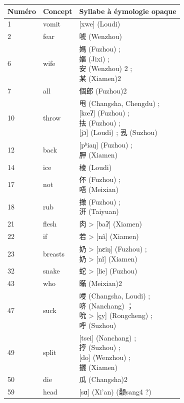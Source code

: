 \documentclass{scrbook}
\newcounter{c}[subsubsection]
\begin{document}
\begin{sloppypar}
\begin{appendices}
\begin{longtable}[htbp]{lll}
    \toprule
    Numéro & Concept & Syllabe à éymologie opaque \\
    \midrule
    1     & vomit & [xwe] (Loudi) \\
    2     & fear  & 唬 (Wenzhou) \\
    6     & wife  & \makecell[l]{媽 (Fuzhou) ; \\嫗 (Jixi) ; \\安 (Wenzhou) 2 ; \\某 (Xiamen)2}  \\
    7     & all   & 個郎 (Fuzhou)2 \\
    10    & throw & \makecell[l]{甩 (Changsha, Chengdu) ; \\{[kœʔ]} (Fuzhou) ; \\抾 (Fuzhou) ; \\{[jɔ]} (Loudi) ; 厾 (Suzhou)} \\
    12    & back  & \makecell[l]{{[pʰiaŋ]} (Fuzhou) ; \\胛 (Xiamen)} \\
    14    & ice  & 棱 (Loudi) \\
    17    & not   & \makecell[l]{伓 (Fuzhou) ; \\唔 (Meixian)} \\
    18    & rub   & \makecell[l]{撖 (Fuzhou) ; \\汧 (Taiyuan)} \\
    21    & flesh & 肉 > [baʔ] (Xiamen) \\
    22    & if    & 若 > [nã] (Xiamen) \\
    23    & breasts & \makecell[l]{奶 > [nɛiŋ] (Fuzhou) ; \\奶 > [nĩ] (Xiamen)} \\
    32    & snake & 蛇 > [lie] (Fuzhou) \\
    43    & who   & 瞞 (Meixian)2 \\
    47    & suck  & \makecell[l]{唚 (Changsha, Loudi) ; \\哜 (Nanchang) ； \\吮 > [çy] (Rongcheng) ; \\呼 (Suzhou)} \\
    49    & split & \makecell[l]{[tsei] (Nanchang) ; \\㧸 (Suzhou) ; \\{[do] (Wenzhou)} ; \\攦 (Xiamen)} \\
    50    & die   & 瓜 (Changsha)2 \\
    59    & head  & [sɑ] (Xi'an) (颡sang4 ?) \\

\end{longtable}
\end{appendices}
\end{sloppypar}
\end{document}
